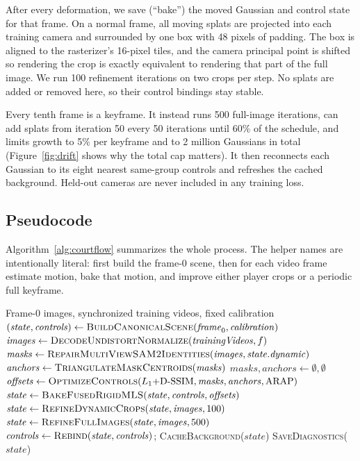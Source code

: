 \documentclass[11pt]{article}
\begin{document}
After every deformation, we save (``bake'') the moved Gaussian and control state for that frame.
On a normal frame, all moving splats are projected into each training camera and surrounded by one
box with 48 pixels of padding. The box is aligned to the rasterizer's 16-pixel tiles, and the camera
principal point is shifted so rendering the crop is exactly equivalent to rendering that part of
the full image. We run 100 refinement iterations on two crops per step. No splats are added or
removed here, so their control bindings stay stable.

Every tenth frame is a keyframe. It instead runs 500 full-image iterations, can add splats from
iteration 50 every 50 iterations until 60\% of the schedule, and limits growth to 5\% per keyframe and to 2 million Gaussians in total (Figure~\ref{fig:drift} shows why the total cap matters).
It then reconnects each Gaussian to its eight nearest same-group controls and refreshes the cached
background. Held-out cameras are never included in any training loss.

\subsection{Pseudocode}
Algorithm~\ref{alg:courtflow} summarizes the whole process. The helper names are intentionally
literal: first build the frame-0 scene, then for each video frame estimate motion, bake that motion,
and improve either player crops or a periodic full keyframe.
\begin{algorithm}[H]
\caption{CourtFlow-GS online reconstruction}\label{alg:courtflow}
\begin{algorithmic}[1]
\Require Frame-0 images, synchronized training videos, fixed calibration
\State $(\mathit{state},\mathit{controls}) \gets \textsc{BuildCanonicalScene}(\mathit{frame}_0,\mathit{calibration})$
  \State $\mathit{images} \gets \textsc{DecodeUndistortNormalize}(\mathit{trainingVideos},f)$
    \State $\mathit{masks} \gets \textsc{RepairMultiViewSAM2Identities}(\mathit{images},\mathit{state.dynamic})$
    \State $\mathit{anchors} \gets \textsc{TriangulateMaskCentroids}(\mathit{masks})$
  \Else
    \State $\mathit{masks},\mathit{anchors} \gets \emptyset,\emptyset$
  \EndIf
  \State $\mathit{offsets} \gets \textsc{OptimizeControls}(L_1{+}\mathrm{D\text{-}SSIM},\mathit{masks},\mathit{anchors},\mathrm{ARAP})$
  \State $\mathit{state} \gets \textsc{BakeFusedRigidMLS}(\mathit{state},\mathit{controls},\mathit{offsets})$
    \State $\mathit{state} \gets \textsc{RefineDynamicCrops}(\mathit{state},\mathit{images},100)$
  \Else
    \State $\mathit{state} \gets \textsc{RefineFullImages}(\mathit{state},\mathit{images},500)$
    \State $\mathit{controls} \gets \textsc{Rebind}(\mathit{state},\mathit{controls})$; \textsc{CacheBackground}($\mathit{state}$)
  \EndIf
  \State \textsc{SaveDiagnostics}($\mathit{state}$)
\EndFor
\end{algorithmic}
\end{algorithm}
\end{document}
